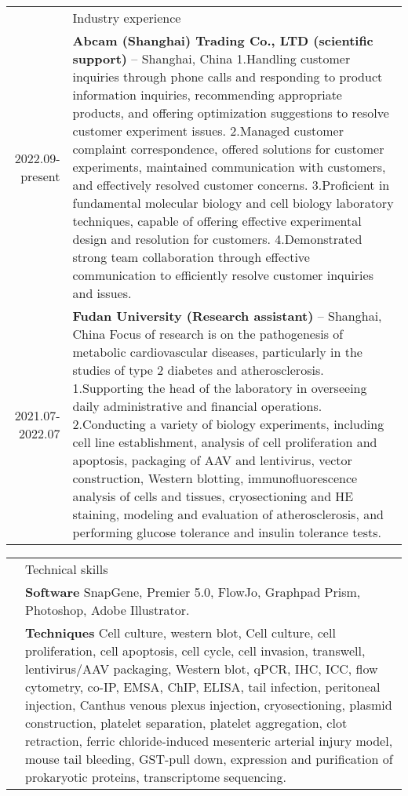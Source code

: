 \documentclass[letterpaper, 11pt]{article}
\newcommand{\headingfont}{\Large\color{OliveGreen}}
\newenvironment{SectionTable}[1]{
	\renewcommand*{\arraystretch}{1.7}
	\setlength{\tabcolsep}{10pt}
	\begin{longtable}{Rp{5.2in}} & #1 \\}
{\end{longtable}\vspace{-.3cm}}
\begin{document}
\begin{SectionTable}{\headingfont Industry experience}

2022.09-present &
\textbf{Abcam (Shanghai) Trading Co., LTD (scientific support)} -- Shanghai, China \newline
1.Handling customer inquiries through phone calls and responding to product information inquiries, recommending appropriate products, and offering optimization suggestions to resolve customer experiment issues.
2.Managed customer complaint correspondence, offered solutions for customer experiments, maintained communication with customers, and effectively resolved customer concerns.                       
3.Proficient in fundamental molecular biology and cell biology laboratory techniques, capable of offering effective experimental design and resolution for customers.
4.Demonstrated strong team collaboration through effective communication to efficiently resolve customer inquiries and issues. \\

2021.07-2022.07 &
\textbf{Fudan University  (Research assistant)} -- Shanghai, China \newline
Focus of research is on the pathogenesis of metabolic cardiovascular diseases, particularly in the studies of type 2 diabetes and atherosclerosis.
1.Supporting the head of the laboratory in overseeing daily administrative and financial operations.
2.Conducting a variety of biology experiments, including cell line establishment, analysis of cell proliferation and apoptosis, packaging of AAV and lentivirus, vector construction, Western blotting, immunofluorescence analysis of cells and tissues, cryosectioning and HE staining, modeling and evaluation of atherosclerosis, and performing glucose tolerance and insulin tolerance tests. \\
\end{SectionTable}

\begin{SectionTable}{\headingfont Technical skills}

& \textbf{Software} \newline
SnapGene, Premier 5.0, FlowJo, Graphpad Prism, Photoshop, Adobe Illustrator.\\

& \textbf{Techniques} \newline
Cell culture, western blot, Cell culture, cell proliferation, cell apoptosis, cell cycle, cell invasion, transwell, lentivirus/AAV packaging, Western blot, qPCR, IHC, ICC, flow cytometry, co-IP, EMSA, ChIP, ELISA, tail infection, peritoneal injection, Canthus venous plexus injection, cryosectioning, plasmid construction, platelet separation, platelet aggregation, clot retraction, ferric chloride-induced mesenteric arterial injury model, mouse tail bleeding, GST-pull down, expression and purification of prokaryotic proteins, transcriptome sequencing. \\
\end{SectionTable}

\end{document}
